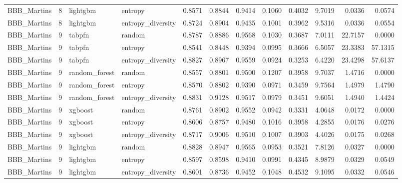 \begin{tabular}{lrllrrrrrrrr}
BBB_Martins & 8 & lightgbm & entropy & 0.8571 & 0.8844 & 0.9414 & 0.1060 & 0.4032 & 9.7019 & 0.0336 & 0.0574 \\
BBB_Martins & 8 & lightgbm & entropy_diversity & 0.8724 & 0.8904 & 0.9435 & 0.1001 & 0.3962 & 9.5316 & 0.0336 & 0.0554 \\
BBB_Martins & 9 & tabpfn & random & 0.8787 & 0.8886 & 0.9568 & 0.1030 & 0.3687 & 7.0111 & 22.7157 & 0.0000 \\
BBB_Martins & 9 & tabpfn & entropy & 0.8541 & 0.8448 & 0.9394 & 0.0995 & 0.3666 & 6.5057 & 23.3383 & 57.1315 \\
BBB_Martins & 9 & tabpfn & entropy_diversity & 0.8827 & 0.8967 & 0.9559 & 0.0924 & 0.3253 & 6.4220 & 23.4298 & 57.6137 \\
BBB_Martins & 9 & random_forest & random & 0.8557 & 0.8801 & 0.9500 & 0.1207 & 0.3958 & 9.7037 & 1.4716 & 0.0000 \\
BBB_Martins & 9 & random_forest & entropy & 0.8570 & 0.8802 & 0.9390 & 0.0971 & 0.3459 & 9.7564 & 1.4979 & 1.4790 \\
BBB_Martins & 9 & random_forest & entropy_diversity & 0.8831 & 0.9128 & 0.9517 & 0.0979 & 0.3451 & 9.6051 & 1.4940 & 1.4424 \\
BBB_Martins & 9 & xgboost & random & 0.8761 & 0.8902 & 0.9552 & 0.0942 & 0.3331 & 4.0648 & 0.0172 & 0.0000 \\
BBB_Martins & 9 & xgboost & entropy & 0.8606 & 0.8757 & 0.9480 & 0.1016 & 0.3958 & 4.2855 & 0.0176 & 0.0276 \\
BBB_Martins & 9 & xgboost & entropy_diversity & 0.8717 & 0.9006 & 0.9510 & 0.1007 & 0.3903 & 4.4026 & 0.0175 & 0.0268 \\
BBB_Martins & 9 & lightgbm & random & 0.8828 & 0.8947 & 0.9565 & 0.0953 & 0.3521 & 7.8126 & 0.0327 & 0.0000 \\
BBB_Martins & 9 & lightgbm & entropy & 0.8597 & 0.8598 & 0.9410 & 0.0991 & 0.4345 & 8.9879 & 0.0329 & 0.0549 \\
BBB_Martins & 9 & lightgbm & entropy_diversity & 0.8601 & 0.8736 & 0.9452 & 0.1048 & 0.4532 & 9.1095 & 0.0332 & 0.0546 \\
\bottomrule
\end{tabular}

